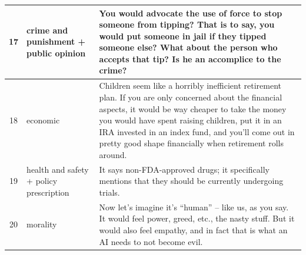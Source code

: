 \documentclass[
10pt, %
a4paper, %
oneside, %
headinclude,footinclude, %
] {book}%
\begin{document}
\begin{longtable}{|c|p{4cm}|p{8cm}|}
17 & crime and punishment + public opinion & You would advocate the use of force to stop someone from tipping? That is to say, you would put someone in jail if they tipped someone else? What about the person who accepts that tip? Is he an accomplice to the crime? \\ \hline

18 & economic & Children seem like a horribly inefficient retirement plan. If you are only concerned about the financial aspects, it would be way cheaper to take the money you would have spent raising children, put it in an IRA invested in an index fund, and you'll come out in pretty good shape financially when retirement rolls around. \\ \hline

19 & health and safety + policy prescription & It says non-FDA-approved drugs; it specifically mentions that they should be currently undergoing trials. \\ \hline

20 & morality & Now let's imagine it's ``human'' -- like us, as you say. It would feel power, greed, etc., the nasty stuff. But it would also feel empathy, and in fact that is what an AI needs to not become evil. \\ \hline

\end{longtable}

\small
\renewcommand{\arraystretch}{1.2}
\end{document}
